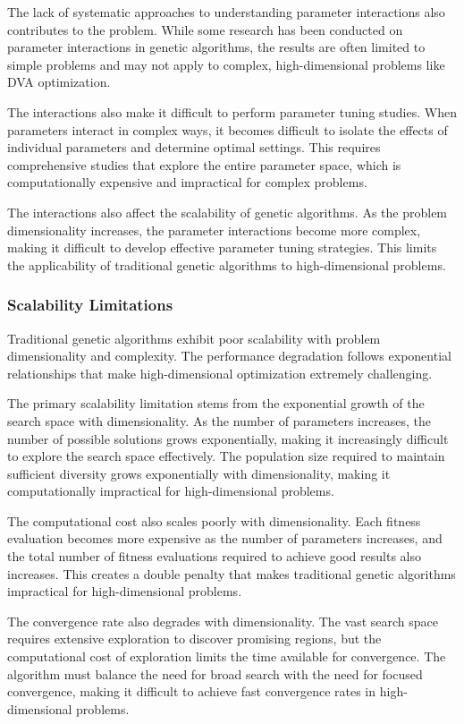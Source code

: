 \documentclass[12pt,a4paper]{article}
\begin{document}
The lack of systematic approaches to understanding parameter interactions also contributes to the problem. While some research has been conducted on parameter interactions in genetic algorithms, the results are often limited to simple problems and may not apply to complex, high-dimensional problems like DVA optimization.

The interactions also make it difficult to perform parameter tuning studies. When parameters interact in complex ways, it becomes difficult to isolate the effects of individual parameters and determine optimal settings. This requires comprehensive studies that explore the entire parameter space, which is computationally expensive and impractical for complex problems.

The interactions also affect the scalability of genetic algorithms. As the problem dimensionality increases, the parameter interactions become more complex, making it difficult to develop effective parameter tuning strategies. This limits the applicability of traditional genetic algorithms to high-dimensional problems.

\subsubsection{Scalability Limitations}

Traditional genetic algorithms exhibit poor scalability with problem dimensionality and complexity. The performance degradation follows exponential relationships that make high-dimensional optimization extremely challenging.

The primary scalability limitation stems from the exponential growth of the search space with dimensionality. As the number of parameters increases, the number of possible solutions grows exponentially, making it increasingly difficult to explore the search space effectively. The population size required to maintain sufficient diversity grows exponentially with dimensionality, making it computationally impractical for high-dimensional problems.

The computational cost also scales poorly with dimensionality. Each fitness evaluation becomes more expensive as the number of parameters increases, and the total number of fitness evaluations required to achieve good results also increases. This creates a double penalty that makes traditional genetic algorithms impractical for high-dimensional problems.

The convergence rate also degrades with dimensionality. The vast search space requires extensive exploration to discover promising regions, but the computational cost of exploration limits the time available for convergence. The algorithm must balance the need for broad search with the need for focused convergence, making it difficult to achieve fast convergence rates in high-dimensional problems.
\end{document}
